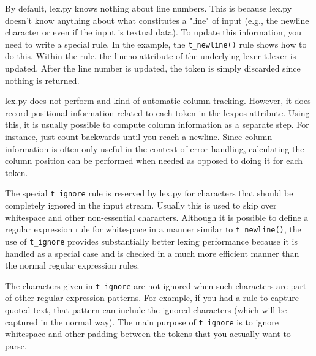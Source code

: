 
By default, lex.py knows nothing about line numbers. This is because lex.py
doesn't know anything about what constitutes a "line" of input (e.g., the
newline character or even if the input is textual data). To update this
information, you need to write a special rule. In the example, the
\verb|t_newline()| rule shows how to do this.
Within the rule, the lineno attribute of the underlying lexer t.lexer is
updated. After the line number is updated, the token is simply discarded since
nothing is returned.

lex.py does not perform and kind of automatic column tracking. However, it does
record positional information related to each token in the lexpos attribute.
Using this, it is usually possible to compute column information as a separate
step. For instance, just count backwards until you reach a newline.
Since column information is often only useful in the context of error handling,
calculating the column position can be performed when needed as opposed to doing
it for each token.


The special \verb|t_ignore| rule is reserved by lex.py for characters that
should be completely ignored in the input stream. Usually this is used to skip
over whitespace and other non-essential characters. Although it is possible to
define a regular expression rule for whitespace in a manner similar to
\verb|t_newline()|, the use of \verb|t_ignore| provides substantially better
lexing performance because it is handled as a special case and is checked in a
much more efficient manner than the normal regular expression rules.

The characters given in \verb|t_ignore| are not ignored when such characters are
part of other regular expression patterns. For example, if you had a rule to
capture quoted text, that pattern can include the ignored characters (which will
be captured in the normal way). The main purpose of \verb|t_ignore| is to ignore
whitespace and other padding between the tokens that you actually want to parse.

\secup
